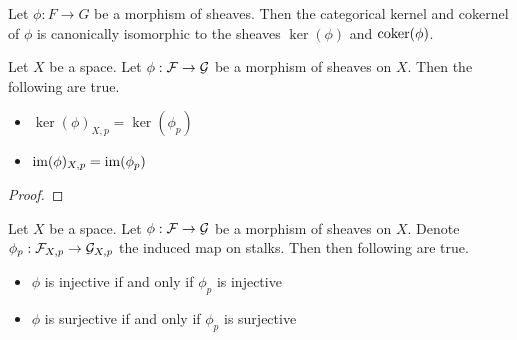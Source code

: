 \documentclass[a4paper]{article}
\begin{document}
\begin{lmm}{}{} Let $\phi:F\to G$ be a morphism of sheaves. Then the categorical kernel and cokernel of $\phi$ is canonically isomorphic to the sheaves $\ker(\phi)$ and $\operatorname{coker}(\phi)$. 
\end{lmm}

\begin{prp}{}{} Let $X$ be a space. Let $\phi:\mathcal{F}\to\mathcal{G}$ be a morphism of sheaves on $X$. Then the following are true. 
\begin{itemize}
\item $\ker(\phi)_{X,p}=\ker(\phi_p)$
\item $\operatorname{im}(\phi)_{X,p}=\operatorname{im}(\phi_p)$
\end{itemize} \tcbline
\begin{proof}
\end{proof}
\end{prp}

\begin{prp}{}{} Let $X$ be a space. Let $\phi:\mathcal{F}\to\mathcal{G}$ be a morphism of sheaves on $X$. Denote $\phi_p:\mathcal{F}_{X,p}\to\mathcal{G}_{X,p}$ the induced map on stalks. Then then following are true. 
\begin{itemize}
\item $\phi$ is injective if and only if $\phi_p$ is injective
\item $\phi$ is surjective if and only if $\phi_p$ is surjective
\end{itemize}
\end{prp}
\end{document}
